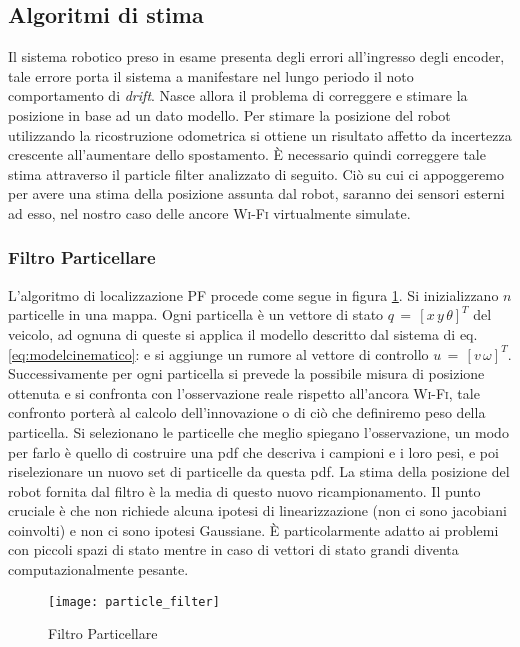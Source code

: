 \subsection{Algoritmi di stima}
Il sistema robotico preso in esame presenta degli errori all'ingresso degli
encoder, tale errore porta il sistema a manifestare nel lungo periodo il noto
comportamento di \emph{drift}.
Nasce allora il problema di correggere e stimare la posizione in base ad un dato
modello.
Per stimare la posizione del robot utilizzando la ricostruzione odometrica si
ottiene un risultato affetto da incertezza crescente all'aumentare dello
spostamento.
È necessario quindi correggere tale stima attraverso il particle
filter\cite{newman2003} analizzato di seguito.
Ciò su cui ci appoggeremo per avere una stima della posizione assunta dal robot,
saranno dei sensori esterni ad esso, nel nostro caso delle ancore \textsc{Wi-Fi}
virtualmente simulate.

\subsubsection{Filtro Particellare}
L'algoritmo di localizzazione PF procede come segue in figura
\ref{fig:particle filter}. Si inizializzano $n$ particelle in una mappa.
Ogni particella è un vettore di stato $q\,=\,[x \, y \, \theta]^{T}$ del veicolo,
ad ognuna di queste si applica il modello descritto dal sistema di
eq.\eqref{eq:modelcinematico}: e si aggiunge un rumore al vettore di
controllo $u\,=\,[v \, \omega]^{T}$.
Successivamente per ogni particella si prevede la possibile misura di posizione ottenuta e
si confronta con l'osservazione reale rispetto all'ancora \textsc{Wi-Fi}, tale
confronto porterà al calcolo dell'innovazione o di ciò che definiremo peso della
particella.
Si selezionano le particelle che meglio spiegano l'osservazione, un modo per
farlo è quello di costruire una pdf che descriva i campioni e i loro pesi, e
poi riselezionare un nuovo set di particelle da questa pdf.
La stima della posizione del robot fornita dal filtro è la media di questo
nuovo ricampionamento.
Il punto cruciale è che non richiede alcuna ipotesi di linearizzazione (non ci
sono jacobiani coinvolti) e non ci sono ipotesi Gaussiane. È particolarmente
adatto ai problemi con piccoli spazi di stato mentre in caso di vettori di
stato grandi diventa computazionalmente pesante.

\begin{figure}[!htb]
 \centering
  \texttt{[image: particle\_filter]}
  \caption{Filtro Particellare}
  \label{fig:particle filter}
\end{figure}
